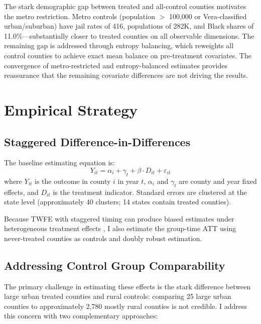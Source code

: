 \documentclass[12pt]{article}
\begin{document}
The stark demographic gap between treated and all-control counties motivates the metro restriction. Metro controls (population $>$ 100,000 or Vera-classified urban/suburban) have jail rates of 416, populations of 282K, and Black shares of 11.0\%---substantially closer to treated counties on all observable dimensions. The remaining gap is addressed through entropy balancing, which reweights all control counties to achieve exact mean balance on pre-treatment covariates. The convergence of metro-restricted and entropy-balanced estimates provides reassurance that the remaining covariate differences are not driving the results.




\section{Empirical Strategy}
\label{sec:strategy}

\subsection{Staggered Difference-in-Differences}

The baseline estimating equation is:
\begin{equation}
Y_{it} = \alpha_i + \gamma_t + \beta \cdot D_{it} + \varepsilon_{it}
\label{eq:twfe}
\end{equation}
where $Y_{it}$ is the outcome in county $i$ in year $t$, $\alpha_i$ and $\gamma_t$ are county and year fixed effects, and $D_{it}$ is the treatment indicator. Standard errors are clustered at the state level (approximately 40 clusters; 14 states contain treated counties).

Because TWFE with staggered timing can produce biased estimates under heterogeneous treatment effects \citep{goodmanbacon2021did, dechaisemartin2020two}, I also estimate the \citet{callaway2021did} group-time ATT using never-treated counties as controls and doubly robust estimation.

\subsection{Addressing Control Group Comparability}

The primary challenge in estimating these effects is the stark difference between large urban treated counties and rural controls: comparing 25 large urban counties to approximately 2,780 mostly rural counties is not credible. I address this concern with two complementary approaches:
\end{document}
